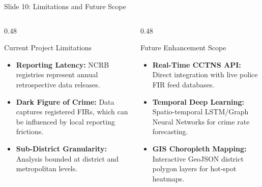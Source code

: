 \documentclass[aspectratio=169,10pt]{beamer}
\begin{document}
\begin{frame}{Slide 10: Limitations and Future Scope}
    \begin{columns}[T]
        \begin{column}{0.48\textwidth}
            \begin{block}{Current Project Limitations}
                \begin{itemize}
                    \item \textbf{Reporting Latency:} NCRB registries represent annual retrospective data releases.
                    \item \textbf{Dark Figure of Crime:} Data captures registered FIRs, which can be influenced by local reporting frictions.
                    \item \textbf{Sub-District Granularity:} Analysis bounded at district and metropolitan levels.
                \end{itemize}
            \end{block}
        \end{column}
        \begin{column}{0.48\textwidth}
            \begin{block}{Future Enhancement Scope}
                \begin{itemize}
                    \item \textbf{Real-Time CCTNS API:} Direct integration with live police FIR feed databases.
                    \item \textbf{Temporal Deep Learning:} Spatio-temporal LSTM/Graph Neural Networks for crime rate forecasting.
                    \item \textbf{GIS Choropleth Mapping:} Interactive GeoJSON district polygon layers for hot-spot heatmaps.
                \end{itemize}
            \end{block}
        \end{column}
    \end{columns}
\end{frame}
\end{document}
